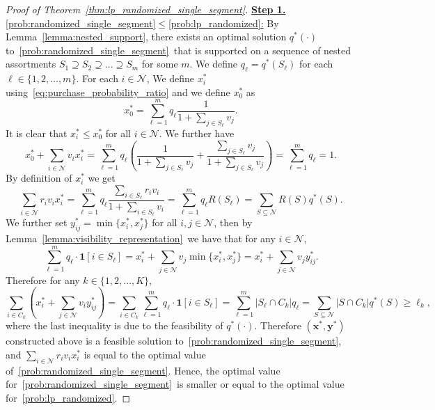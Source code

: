 \documentclass[msom,non-blindrev]{informs3} %
\theoremstyle{definition}
\begin{document}
\begin{proof}[Proof of Theorem~\ref{thm:lp_randomized_single_segment}]
\underline{\textbf{Step 1.} \eqref{prob:randomized_single_segment}$\leq$\eqref{prob:lp_randomized}:} By Lemma~\ref{lemma:nested_support}, there exists an optimal solution $q^*(\cdot)$ to~\eqref{prob:randomized_single_segment}~that is supported on a sequence of nested assortments $S_1\supseteq S_2\supseteq\dots\supseteq S_m$ for some $m$. We define $q_\ell=q^*(S_\ell)$ for each $\ell\in\{1,2,\dots,m\}$. For each $i\in\mathcal{N}$, We define $x^*_i$ using~\eqref{eq:purchase_probability_ratio} and we define $x^*_0$ as
\begin{equation*}
x^*_0=\sum_{\ell=1}^m q_\ell\dfrac{1}{1+\sum_{j\in S_\ell}v_j}.
\end{equation*}
It is clear that $x^*_i\leq x^*_0$ for all $i\in\mathcal{N}$. We further have
\begin{equation*}
x^*_0+\sum_{i\in\mathcal{N}}v_ix^*_i=\sum_{\ell=1}^m q_\ell\left(\dfrac{1}{1+\sum_{j\in S_\ell}v_j}+\dfrac{\sum_{j\in S_\ell}v_j}{1+\sum_{j\in S_{\ell}}v_j}\right)=\sum_{\ell=1}^m q_\ell=1.
\end{equation*}
By definition of $x^*_i$ we get
\begin{equation*}
\sum_{i\in\mathcal{N}}r_iv_ix^*_i=\sum_{\ell=1}^mq_\ell\dfrac{\sum_{i\in S_\ell}r_iv_i}{1+\sum_{i\in S_\ell}v_i}=\sum_{\ell=1}^m q_\ell R(S_\ell)=\sum_{S\subseteq\mathcal{N}}R(S)q^*(S).
\end{equation*}
We further set $y^*_{ij}=\min\{x^*_i,x^*_j\}$ for all $i,j\in\mathcal{N}$, then by Lemma~\ref{lemma:visibility_representation}~we have that for any $i\in\mathcal{N}$,
\begin{equation*}
\sum_{\ell=1}^m q_\ell\cdot \bm{1}[i\in S_\ell]=x^*_i+\sum_{j\in\mathcal{N}}v_j\min\{x^*_i,x^*_j\}=x^*_i+\sum_{j\in\mathcal{N}}v_jy^*_{ij}.
\end{equation*}
Therefore for any $k\in \{1,2,\dots,K\}$,
\begin{equation*}
\sum_{i\in C_k}\left(x^*_i+\sum_{j\in \mathcal{N}}v_iy^*_{ij}\right)=\sum_{i\in C_k}\sum_{\ell=1}^m q_\ell\cdot \bm{1}[i\in S_\ell]=\sum_{\ell=1}^m |S_\ell\cap C_k|q_\ell=\sum_{S\subseteq\mathcal{N}}|S\cap C_k|q^*(S)\geq \ell_k,
\end{equation*}
where the last inequality is due to the feasibility of $q^*(\cdot)$. Therefore $(\mathbf{x}^*,\mathbf{y}^*)$ constructed above is a feasible solution to~\eqref{prob:randomized_single_segment}, and $\sum_{i\in\mathcal{N}}r_iv_ix^*_i$ is equal to the optimal value of~\eqref{prob:randomized_single_segment}. Hence, the optimal value for~\eqref{prob:randomized_single_segment}~is smaller or equal to the optimal value for~\eqref{prob:lp_randomized}.


\end{proof}
\end{document}
